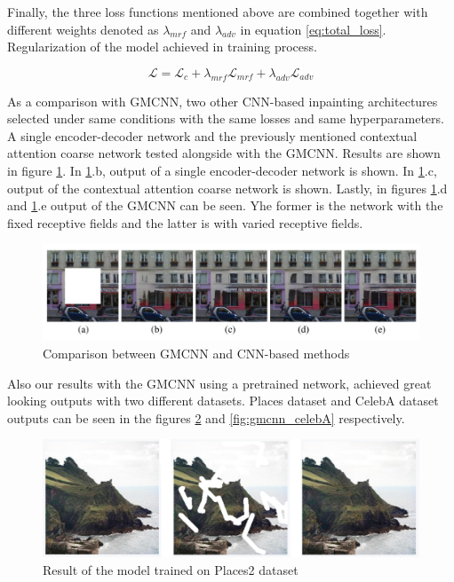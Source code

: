 Finally, the three loss functions mentioned above are combined together with different weights denoted as \(\lambda_{mrf}\) and \(\lambda_{adv}\) in equation \ref{eq:total_loss}. Regularization of the model achieved in training process.

\begin{equation}
    \mathcal{L} = \mathcal{L}_{c} + \lambda_{mrf} \mathcal{L}_{mrf} + \lambda_{adv} \mathcal{L}_{adv}
    \label{eq:total_loss}
\end{equation}

As a comparison with GMCNN, two other CNN-based inpainting architectures selected under same conditions with the same losses and same hyperparameters. A single encoder-decoder network and the previously mentioned contextual attention coarse network \cite{generative_contextual} tested alongside with the GMCNN. Results are shown in figure \ref{fig:gmcnn_paris_comparison}. In \ref{fig:gmcnn_paris_comparison}.b, output of a single encoder-decoder network is shown. In \ref{fig:gmcnn_paris_comparison}.c, output of the contextual attention
coarse network is shown. Lastly, in figures \ref{fig:gmcnn_paris_comparison}.d and \ref{fig:gmcnn_paris_comparison}.e output of the GMCNN can be seen. Yhe former is the network with the fixed receptive fields and the latter is with varied receptive fields.

\begin{figure}[h!]
    \centering
    \includegraphics[width=14cm]{figures/chapter4/gmcnn_paris_comparison.png}
    \caption{Comparison between GMCNN and CNN-based methods \cite{inpainting_via_multi_cnn}}
    \label{fig:gmcnn_paris_comparison}
\end{figure}

Also our results with the GMCNN using a pretrained network, achieved great looking outputs with two different datasets. Places \cite{dataset_places} dataset and CelebA \cite{celebA} dataset outputs can be seen in the figures \ref{fig:gmcnn_places2} and \ref{fig:gmcnn_celebA} respectively.

\begin{figure}[h!]
    \centering
    \includegraphics[width=14cm]{figures/chapter4/gmcnnout2.png}
    \vspace*{3mm}
    \caption{Result of the model trained on Places2 dataset}
    \label{fig:gmcnn_places2}
\end{figure}

